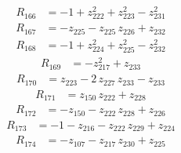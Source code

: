 \begin{equation*}\begin{aligned}
R_{166}&=-1 +z_{222}^{2} +z_{223}^{2} -z_{231}^{2}
\end{aligned}\end{equation*}
\begin{equation*}\begin{aligned}
R_{167}&=-z_{225} -z_{225}\,z_{226} +z_{232}
\end{aligned}\end{equation*}
\begin{equation*}\begin{aligned}
R_{168}&=-1 +z_{224}^{2} +z_{225}^{2} -z_{232}^{2}
\end{aligned}\end{equation*}
\begin{equation*}\begin{aligned}
R_{169}&=-z_{217}^{2} +z_{233}
\end{aligned}\end{equation*}
\begin{equation*}\begin{aligned}
R_{170}&=z_{223} -2\,z_{227}\,z_{233} -z_{233}
\end{aligned}\end{equation*}
\begin{equation*}\begin{aligned}
R_{171}&=z_{150}\,z_{222} +z_{228}
\end{aligned}\end{equation*}
\begin{equation*}\begin{aligned}
R_{172}&=-z_{150} -z_{222}\,z_{228} +z_{226}
\end{aligned}\end{equation*}
\begin{equation*}\begin{aligned}
R_{173}&=-1 -z_{216} -z_{222}\,z_{229} +z_{224}
\end{aligned}\end{equation*}
\begin{equation*}\begin{aligned}
R_{174}&=-z_{107} -z_{217}\,z_{230} +z_{225}
\end{aligned}\end{equation*}

